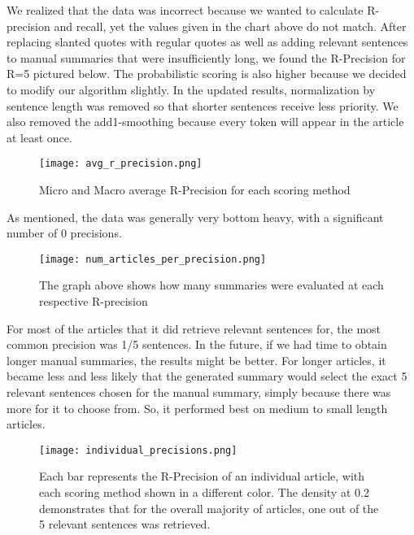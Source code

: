 \documentclass[11pt,a4paper]{article}
\begin{document}
  We realized that the data was incorrect because we wanted to calculate R-precision and recall, yet the values given in the chart above do not match. After replacing slanted quotes with regular quotes as well as adding relevant sentences to manual summaries that were insufficiently long, we found the  R-Precision for R=5 pictured below. The probabilistic scoring is also higher because we decided to modify our algorithm slightly. In the updated results, normalization by sentence length was removed so that shorter sentences receive less priority. We also removed the add1-smoothing because every token will appear in the article at least once.

  \begin{figure}[htp]
  \texttt{[image: avg\_r\_precision.png]}
  \caption {Micro and Macro average R-Precision for each scoring method}
  \end{figure}

  As mentioned, the data was generally very bottom heavy, with a significant number of 0 precisions.

  \begin{figure}[htp]
  \texttt{[image: num\_articles\_per\_precision.png]}
  \caption {The graph above shows how many summaries were evaluated at each respective R-precision}
  \end{figure}

  For most of the articles that it did retrieve relevant sentences for, the most common precision was 1/5 sentences. In the future, if we had time to obtain longer manual summaries, the results might be better. For longer articles, it became less and less likely that the generated summary would select the exact 5 relevant sentences chosen for the manual summary, simply because there was more for it to choose from. So, it performed best on medium to small length articles.

  \begin{figure}[htp]
  \texttt{[image: individual\_precisions.png]}
  \caption {Each bar represents the R-Precision of an individual article, with each scoring method shown in a different color. The density at 0.2 demonstrates that for the overall majority of articles, one out of the 5 relevant sentences was retrieved.}
  \end{figure}
\end{document}
